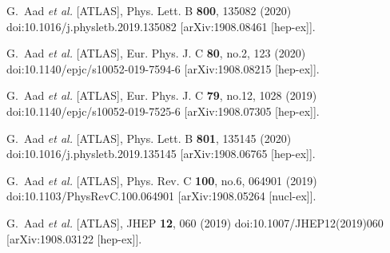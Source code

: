 \begin{thebibliography}{9}
G.~Aad \textit{et al.} [ATLAS],
Phys. Lett. B \textbf{800}, 135082 (2020)
doi:10.1016/j.physletb.2019.135082
[arXiv:1908.08461 [hep-ex]].

G.~Aad \textit{et al.} [ATLAS],
Eur. Phys. J. C \textbf{80}, no.2, 123 (2020)
doi:10.1140/epjc/s10052-019-7594-6
[arXiv:1908.08215 [hep-ex]].

G.~Aad \textit{et al.} [ATLAS],
Eur. Phys. J. C \textbf{79}, no.12, 1028 (2019)
doi:10.1140/epjc/s10052-019-7525-6
[arXiv:1908.07305 [hep-ex]].

G.~Aad \textit{et al.} [ATLAS],
Phys. Lett. B \textbf{801}, 135145 (2020)
doi:10.1016/j.physletb.2019.135145
[arXiv:1908.06765 [hep-ex]].

G.~Aad \textit{et al.} [ATLAS],
Phys. Rev. C \textbf{100}, no.6, 064901 (2019)
doi:10.1103/PhysRevC.100.064901
[arXiv:1908.05264 [nucl-ex]].

G.~Aad \textit{et al.} [ATLAS],
JHEP \textbf{12}, 060 (2019)
doi:10.1007/JHEP12(2019)060
[arXiv:1908.03122 [hep-ex]].


\end{thebibliography}
